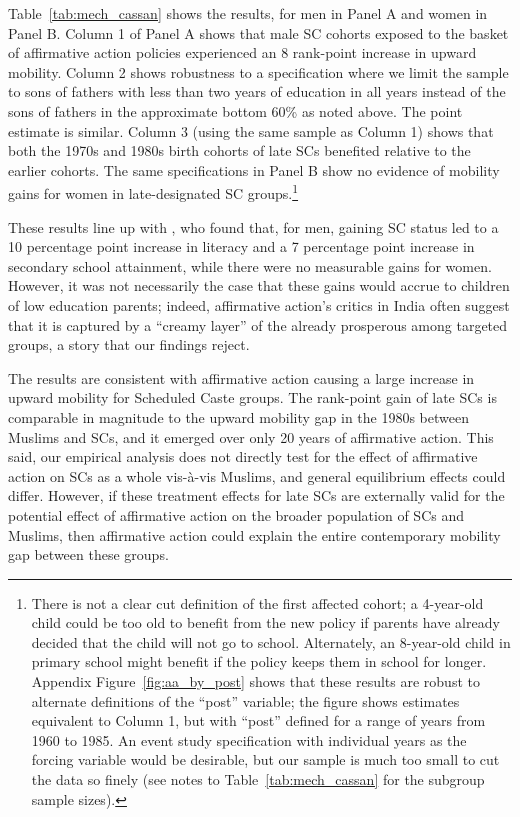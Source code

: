 \documentclass[12pt,letterpaper]{article}
\numberwithin{equation}{section}
\begin{document}
Table~\ref{tab:mech_cassan} shows the results, for men in Panel A and women in Panel B. Column 1 of Panel A shows that male SC cohorts exposed to the basket of affirmative action policies experienced an 8 rank-point increase in upward mobility. Column 2 shows robustness to a specification where we limit the sample to sons of fathers with less than two years of education in all years instead of the sons of fathers in the approximate bottom 60\% as noted above. The point estimate is similar. Column 3 (using the same sample as Column 1) shows that both the 1970s and 1980s birth cohorts of late SCs benefited relative to the earlier cohorts. The same specifications in Panel B show no evidence of mobility gains for women in late-designated SC groups.\footnote{There is not a clear cut definition of the first affected cohort; a 4-year-old child could be too old to benefit from the new policy if parents have already decided that the child will not go to school. Alternately, an 8-year-old child in primary school might benefit if the policy keeps them in school for longer. Appendix Figure~\ref{fig:aa_by_post} shows that these results are robust to alternate definitions of the ``post'' variable; the figure shows estimates equivalent to Column 1, but with ``post'' defined for a range of years from 1960 to 1985. An event study specification with individual years as the forcing variable would be desirable, but our sample is much too small to cut the data so finely (see notes to Table~\ref{tab:mech_cassan} for the subgroup sample sizes).}

These results line up with , who found that, for men, gaining SC status led to a 10 percentage point increase in literacy and a 7 percentage point increase in secondary school attainment, while there were no measurable gains for women. However, it was not necessarily the case that these gains would accrue to children of low education parents; indeed, affirmative action's critics in India often suggest that it is captured by a ``creamy layer'' of the already prosperous among targeted groups, a story that our findings reject.

The results are consistent with affirmative action causing a large increase in upward mobility for Scheduled Caste groups. The rank-point gain of late SCs is comparable in magnitude to the upward mobility gap in the 1980s between Muslims and SCs, and it emerged over only 20 years of affirmative action. This said, our empirical analysis does not directly test for the effect of affirmative action on SCs as a whole vis-\`{a}-vis Muslims, and general equilibrium effects could differ. However, if these treatment effects for late SCs are externally valid for the potential effect of affirmative action on the broader population of SCs and Muslims, then affirmative action could explain the entire contemporary mobility gap between these groups.
\end{document}
